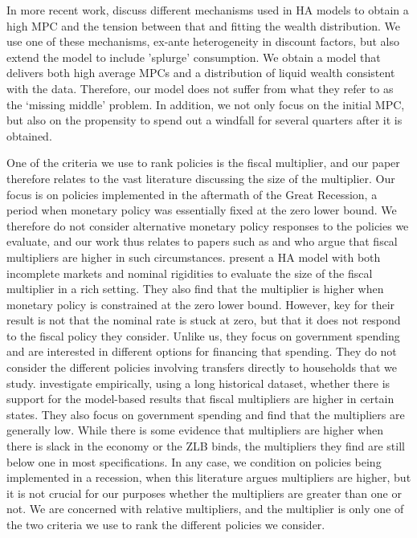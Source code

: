 \documentclass[../HAFiscal]{subfiles}
\begin{document}
In more recent work, \cite{kaplanMPC2022} discuss different mechanisms used in HA models to obtain a high MPC and the tension between that and fitting the wealth distribution. We use one of these mechanisms, ex-ante heterogeneity in discount factors, but also extend the model to include 'splurge' consumption. We obtain a model that delivers both high average MPCs and a distribution of liquid wealth consistent with the data. Therefore, our model does not suffer from what they refer to as the `missing middle' problem. In addition, we not only focus on the initial MPC, but also on the propensity to spend out a windfall for several quarters after it is obtained. 

One of the criteria we use to rank policies is the fiscal multiplier, and our paper therefore relates to the vast literature discussing the size of the multiplier. Our focus is on policies implemented in the aftermath of the Great Recession, a period when monetary policy was essentially fixed at the zero lower bound. We therefore do not consider alternative monetary policy responses to the policies we evaluate, and our work thus relates to papers such as \cite{christiano2011government} and \cite{eggertsson2011fiscal} who argue that fiscal multipliers are higher in such circumstances. \cite{hagedorn2019fiscal} present a HA model with both incomplete markets and nominal rigidities to evaluate the size of the fiscal multiplier in a rich setting. They also find that the multiplier is higher when monetary policy is constrained at the zero lower bound. However, key for their result is not that the nominal rate is stuck at zero, but that it does not respond to the fiscal policy they consider. Unlike us, they focus on government spending and are interested in different options for financing that spending. They do not consider the different policies involving transfers directly to households that we study. \cite{ramey2018government} investigate empirically, using a long historical dataset, whether there is support for the model-based results that fiscal multipliers are higher in certain states. They also focus on government spending and find that the multipliers are generally low. While there is some evidence that multipliers are higher when there is slack in the economy or the ZLB binds, the multipliers they find are still below one in most specifications. In any case, we condition on policies being implemented in a recession, when this literature argues multipliers are higher, but it is not crucial for our purposes whether the multipliers are greater than one or not. We are concerned with relative multipliers, and the multiplier is only one of the two criteria we use to rank the different policies we consider. 
\end{document}
